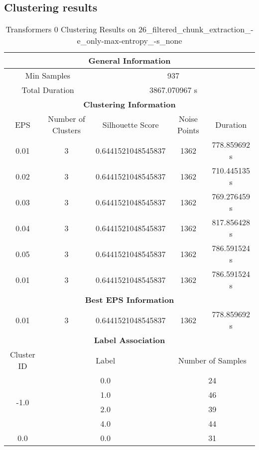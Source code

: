 \subsection*{Clustering results}
\begin{longtable}{|c|c|c|c|c|}
    \caption{Transformers 0 Clustering Results on 26\_filtered\_chunk\_extraction\_-e\_only-max-entropy\_-s\_none} \label{tab:transformers_0_clustering_results}\\
    \hline
    \multicolumn{5}{|c|}{\textbf{General Information}} \\
    \hline
    \multicolumn{2}{|c|}{Min Samples} & \multicolumn{3}{c|}{937} \\
    \multicolumn{2}{|c|}{Total Duration} & \multicolumn{3}{c|}{3867.070967 s} \\
    \hline
    \multicolumn{5}{|c|}{\textbf{Clustering Information}} \\
    \hline
    EPS & Number of Clusters & Silhouette Score & Noise Points & Duration \\
    0.01 & 3 & 0.6441521048545837 & 1362 & 778.859692 s\\
    0.02 & 3 & 0.6441521048545837 & 1362 & 710.445135 s\\
    0.03 & 3 & 0.6441521048545837 & 1362 & 769.276459 s\\
    0.04 & 3 & 0.6441521048545837 & 1362 & 817.856428 s\\
    0.05 & 3 & 0.6441521048545837 & 1362 & 786.591524 s\\
    0.01 & 3 & 0.6441521048545837 & 1362 & 786.591524 s\\
    \hline
    \multicolumn{5}{|c|}{\textbf{Best EPS Information}} \\
    \hline
    0.01 & 3 & 0.6441521048545837 & 1362 & 778.859692 s\\
    \hline
    \multicolumn{5}{|c|}{\textbf{Label Association}} \\
    \hline
    Cluster ID & \multicolumn{2}{c|}{Label} & \multicolumn{2}{c|}{Number of Samples} \\
    \hline
    \multirow{4}{*}{-1.0} & \multicolumn{2}{c|}{0.0} & \multicolumn{2}{c|}{24} \\
    & \multicolumn{2}{c|}{1.0} & \multicolumn{2}{c|}{46} \\
    & \multicolumn{2}{c|}{2.0} & \multicolumn{2}{c|}{39} \\
    & \multicolumn{2}{c|}{4.0} & \multicolumn{2}{c|}{44} \\
    \hline
    \multirow{4}{*}{0.0} & \multicolumn{2}{c|}{0.0} & \multicolumn{2}{c|}{31} \\

\end{longtable}
